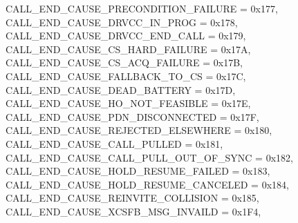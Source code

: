 \begin{DoxyItemize}
 C\+A\+L\+L\+\_\+\+E\+N\+D\+\_\+\+C\+A\+U\+S\+E\+\_\+\+P\+R\+E\+C\+O\+N\+D\+I\+T\+I\+O\+N\+\_\+\+F\+A\+I\+L\+U\+RE = 0x177,~\newline
 C\+A\+L\+L\+\_\+\+E\+N\+D\+\_\+\+C\+A\+U\+S\+E\+\_\+\+D\+R\+V\+C\+C\+\_\+\+I\+N\+\_\+\+P\+R\+OG = 0x178,~\newline
 C\+A\+L\+L\+\_\+\+E\+N\+D\+\_\+\+C\+A\+U\+S\+E\+\_\+\+D\+R\+V\+C\+C\+\_\+\+E\+N\+D\+\_\+\+C\+A\+LL = 0x179,~\newline
 C\+A\+L\+L\+\_\+\+E\+N\+D\+\_\+\+C\+A\+U\+S\+E\+\_\+\+C\+S\+\_\+\+H\+A\+R\+D\+\_\+\+F\+A\+I\+L\+U\+RE = 0x17A,~\newline
 C\+A\+L\+L\+\_\+\+E\+N\+D\+\_\+\+C\+A\+U\+S\+E\+\_\+\+C\+S\+\_\+\+A\+C\+Q\+\_\+\+F\+A\+I\+L\+U\+RE = 0x17B,~\newline
 C\+A\+L\+L\+\_\+\+E\+N\+D\+\_\+\+C\+A\+U\+S\+E\+\_\+\+F\+A\+L\+L\+B\+A\+C\+K\+\_\+\+T\+O\+\_\+\+CS = 0x17C,~\newline
 C\+A\+L\+L\+\_\+\+E\+N\+D\+\_\+\+C\+A\+U\+S\+E\+\_\+\+D\+E\+A\+D\+\_\+\+B\+A\+T\+T\+E\+RY = 0x17D,~\newline
 C\+A\+L\+L\+\_\+\+E\+N\+D\+\_\+\+C\+A\+U\+S\+E\+\_\+\+H\+O\+\_\+\+N\+O\+T\+\_\+\+F\+E\+A\+S\+I\+B\+LE = 0x17E,~\newline
 C\+A\+L\+L\+\_\+\+E\+N\+D\+\_\+\+C\+A\+U\+S\+E\+\_\+\+P\+D\+N\+\_\+\+D\+I\+S\+C\+O\+N\+N\+E\+C\+T\+ED = 0x17F,~\newline
 C\+A\+L\+L\+\_\+\+E\+N\+D\+\_\+\+C\+A\+U\+S\+E\+\_\+\+R\+E\+J\+E\+C\+T\+E\+D\+\_\+\+E\+L\+S\+E\+W\+H\+E\+RE = 0x180,~\newline
 C\+A\+L\+L\+\_\+\+E\+N\+D\+\_\+\+C\+A\+U\+S\+E\+\_\+\+C\+A\+L\+L\+\_\+\+P\+U\+L\+L\+ED = 0x181,~\newline
 C\+A\+L\+L\+\_\+\+E\+N\+D\+\_\+\+C\+A\+U\+S\+E\+\_\+\+C\+A\+L\+L\+\_\+\+P\+U\+L\+L\+\_\+\+O\+U\+T\+\_\+\+O\+F\+\_\+\+S\+Y\+NC = 0x182,~\newline
 C\+A\+L\+L\+\_\+\+E\+N\+D\+\_\+\+C\+A\+U\+S\+E\+\_\+\+H\+O\+L\+D\+\_\+\+R\+E\+S\+U\+M\+E\+\_\+\+F\+A\+I\+L\+ED = 0x183,~\newline
 C\+A\+L\+L\+\_\+\+E\+N\+D\+\_\+\+C\+A\+U\+S\+E\+\_\+\+H\+O\+L\+D\+\_\+\+R\+E\+S\+U\+M\+E\+\_\+\+C\+A\+N\+C\+E\+L\+ED = 0x184,~\newline
 C\+A\+L\+L\+\_\+\+E\+N\+D\+\_\+\+C\+A\+U\+S\+E\+\_\+\+R\+E\+I\+N\+V\+I\+T\+E\+\_\+\+C\+O\+L\+L\+I\+S\+I\+ON = 0x185,~\newline
 C\+A\+L\+L\+\_\+\+E\+N\+D\+\_\+\+C\+A\+U\+S\+E\+\_\+X\+C\+S\+F\+B\+\_\+\+M\+S\+G\+\_\+\+I\+N\+V\+A\+I\+LD = 0x1\+F4,~\newline

\end{DoxyItemize}
